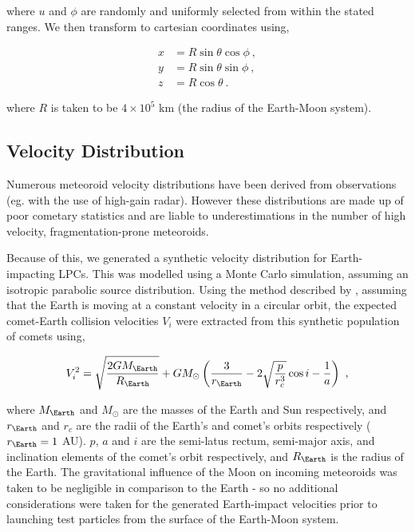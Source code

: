 where $u$ and $\phi$ are randomly and uniformly selected from within the stated ranges. We then transform to cartesian coordinates using,

\begin{equation}
\begin{split}
    x &= R\sin{\theta}\cos{\phi}~, \\
    y &= R\sin{\theta}\sin{\phi}~, \\
    z &= R\cos{\theta}~.
\end{split}
\end{equation}

where $R$ is taken to be $4\times10^5$ km (the radius of the Earth-Moon system). 

\subsection{Velocity Distribution}


Numerous meteoroid velocity distributions have been derived from observations (eg. \citep{HUNT200434} with the use of high-gain radar). However these distributions are made up of poor cometary statistics and are liable to underestimations in the number of high velocity, fragmentation-prone meteoroids.

Because of this, we generated a synthetic velocity distribution for Earth-impacting LPCs. This was modelled using a Monte Carlo simulation, assuming an isotropic parabolic source distribution. Using the method described by \cite{2000MNRAS.315..629H}, assuming that the Earth is moving at a constant velocity in a circular orbit, the expected comet-Earth collision velocities $V_i$ were extracted from this synthetic population of comets using,

\begin{equation}
    V_i^2 = \sqrt{\dfrac{2GM_\Earth}{R_\Earth}} + GM_\odot \left(\dfrac{3}{r_\Earth}-2 \sqrt{\dfrac{p}{r_c^3}} \cos i - \dfrac{1}{a}\right) ~,
    \label{eq:im_vel}
\end{equation}

where $M_\Earth$ and $M_\odot$ are the masses of the Earth and Sun respectively, and $r_\Earth$ and $r_c$ are the radii of the Earth's and comet's orbits respectively ($r_\Earth = 1$ AU). $p$, $a$ and $i$ are the semi-latus rectum, semi-major axis, and inclination elements of the comet's orbit respectively, and $R_\Earth$ is the radius of the Earth. The gravitational influence of the Moon on incoming meteoroids was taken to be negligible in comparison to the Earth - so no additional considerations were taken for the generated Earth-impact velocities prior to launching test particles from the surface of the Earth-Moon system.

